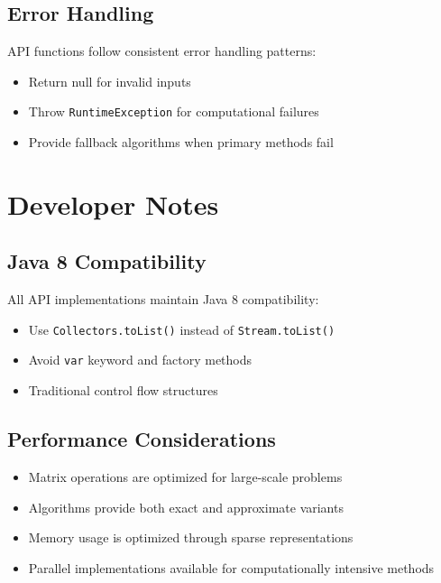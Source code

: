 \subsection{Error Handling}
API functions follow consistent error handling patterns:
\begin{itemize}
\item Return null for invalid inputs
\item Throw \texttt{RuntimeException} for computational failures  
\item Provide fallback algorithms when primary methods fail
\end{itemize}

\section{Developer Notes}

\subsection{Java 8 Compatibility}
All API implementations maintain Java 8 compatibility:
\begin{itemize}
\item Use \texttt{Collectors.toList()} instead of \texttt{Stream.toList()}
\item Avoid \texttt{var} keyword and factory methods
\item Traditional control flow structures
\end{itemize}

\subsection{Performance Considerations}
\begin{itemize}
\item Matrix operations are optimized for large-scale problems
\item Algorithms provide both exact and approximate variants
\item Memory usage is optimized through sparse representations
\item Parallel implementations available for computationally intensive methods
\end{itemize}